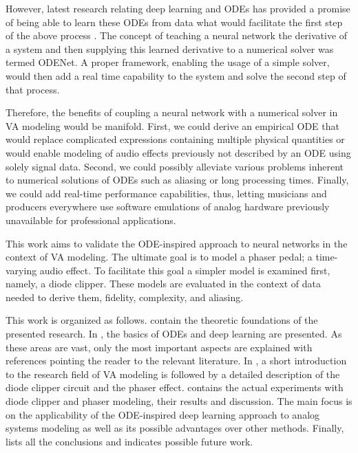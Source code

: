 However, latest research relating deep learning and \acp{ODE} has provided a promise of being able to learn these \acp{ODE} from data what would facilitate the first step of the above process \cite{Chen2018}. The concept of teaching a neural network the derivative of a system and then supplying this learned derivative to a numerical solver was termed ODENet. A proper framework, enabling the usage of a simple solver, would then add a real time capability to the system and solve the second step of that process.

Therefore, the benefits of coupling a neural network with a numerical solver in \ac{VA} modeling would be manifold. First, we could derive an empirical \ac{ODE} that would replace complicated expressions containing multiple physical quantities or would enable modeling of audio effects previously not described by an \ac{ODE} using solely signal data. Second, we could possibly alleviate various problems inherent to numerical solutions of \acp{ODE} such as aliasing or long processing times. Finally, we could add real-time performance capabilities, thus, letting musicians and producers everywhere use software emulations of analog hardware previously unavailable for professional applications.

This work aims to validate the \ac{ODE}-inspired approach to neural networks in the context of \ac{VA} modeling. The ultimate goal is to model a phaser pedal; a time-varying audio effect. To facilitate this goal a simpler model is examined first, namely, a diode clipper. These models are evaluated in the context of data needed to derive them, fidelity, complexity, and aliasing.

This work is organized as follows.  contain the theoretic foundations of the presented research. In , the basics of \acp{ODE} and deep learning are presented. As these areas are vast, only the most important aspects are explained with references pointing the reader to the relevant literature. In , a short introduction to the research field of \ac{VA} modeling is followed by a detailed description of the diode clipper circuit and the phaser effect.  contains the actual experiments with diode clipper and phaser modeling, their results and discussion. The main focus is on the applicability of the \ac{ODE}-inspired deep learning approach to analog systems modeling as well as its possible advantages over other methods. Finally,  lists all the conclusions and indicates possible future work.

